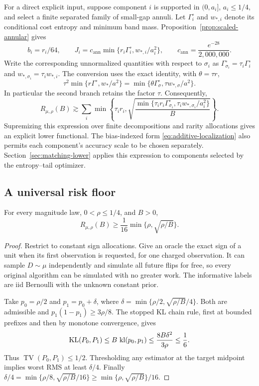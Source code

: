 For a direct explicit input, suppose component $i$ is supported in
$(0,a_i]$, $a_i\le1/4$, and select a finite separated family of small-gap
annuli. Let $\Gamma_i^{\circ}$ and $w_{*,i}$ denote its conditional cost entropy
and minimum band mass. Proposition~\ref{prop:scaled-annular} gives
\[
 b_i=r_i/64,\qquad
 J_i=c_{\mathrm{ann}}
       \min\{r_i\Gamma_i^{\circ},w_{*,i}/a_i^2\},\qquad
 c_{\mathrm{ann}}=\frac{e^{-28}}{2{,}000{,}000}.
\]
Write the corresponding unnormalized quantities with respect to
$\sigma_i$ as $\Gamma_{\sigma_i}^{\circ}=\tau_i\Gamma_i^{\circ}$ and
$w_{*,\sigma_i}=\tau_iw_{*,i}$. The conversion uses the exact identity, with $\theta=\tau r$,
\[
 \tau^2\min\{r\Gamma^{\circ},w_*/a^2\}
 =\min\{\theta\Gamma_{\sigma}^{\circ},\tau w_{*,\sigma}/a^2\}.
\]
In particular the second branch retains the factor $\tau$. Consequently,
\begin{equation}\label{eq:additive-annular}
 R_{\mu,\rho}(B)\gtrsim
 \sum_i\min\left\{\tau_i r_i,
 \sqrt{\frac{
 \min\{\tau_i r_i\Gamma_{\sigma_i}^{\circ},
           \tau_iw_{*,\sigma_i}/a_i^2\}}B}\right\}.
\end{equation}
Supremizing this expression over finite decompositions and rarity
allocations gives an explicit lower functional. The bias-indexed form
\eqref{eq:additive-localization} also permits each component's accuracy
scale to be chosen separately. Section~\ref{sec:matching-lower} applies this expression to components
selected by the entropy--tail optimizer.


\subsection{A universal risk floor}

\begin{lemma}\label{lem:tf-floor}
For every magnitude law, $0<\rho\le1/4$, and $B>0$,
\[
 R_{\mu,\rho}(B)\ge\frac1{16}
       \min\{\rho,\sqrt{\rho/B}\}.
\]
\end{lemma}
\begin{proof}
Restrict to constant sign allocations. Give an oracle the exact sign
of a unit when its first observation is requested, for one charged
observation. It can sample $D\sim\mu$
independently and simulate all future flips for free, so every original
algorithm can be simulated with no greater work. The informative labels
are iid Bernoulli with the unknown constant prior.

Take $p_0=\rho/2$ and $p_1=p_0+\delta$, where
$\delta=\min\{\rho/2,\sqrt{\rho/B}/4\}$. Both are admissible and
$p_1(1-p_1)\ge3\rho/8$. The stopped KL chain rule, first at bounded
prefixes and then by monotone convergence, gives
\[
 \operatorname{KL}(P_0,P_1)\le B\,\operatorname{kl}(p_0,p_1)
 \le\frac{8B\delta^2}{3\rho}\le\frac16.
\]
Thus $\operatorname{TV}(P_0,P_1)\le1/2$. Thresholding any estimator at
the target midpoint implies worst RMS at least $\delta/4$.
Finally
$\delta/4=\min\{\rho/8,\sqrt{\rho/B}/16\}
\ge\min\{\rho,\sqrt{\rho/B}\}/16$.
\end{proof}
